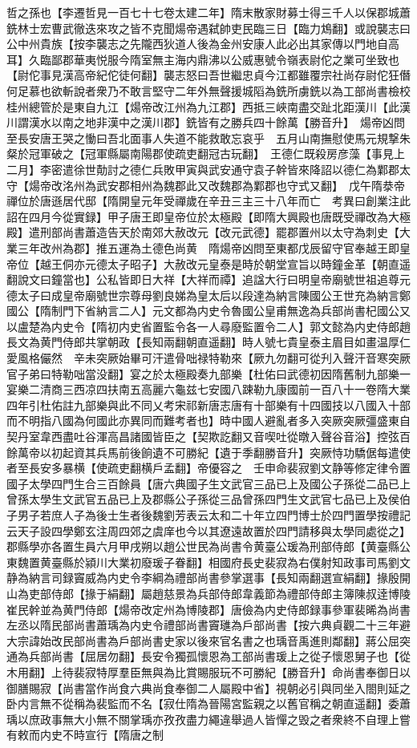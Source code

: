 哲之孫也【李遷哲見一百七十七卷太建二年】隋末散家財募士得三千人以保郡城蕭銑林士宏曹武徹迭來攻之皆不克聞煬帝遇弑帥吏民臨三日【臨力鴆翻】或說襲志曰公中州貴族【按李襲志之先隴西狄道人後為金州安康人此必出其家傳以門地自高耳】久臨鄙郡華夷悦服今隋室無主海内鼎沸以公威惠號令嶺表尉佗之業可坐致也【尉佗事見漢高帝紀佗徒何翻】襲志怒曰吾世繼忠貞今江都雖覆宗社尚存尉佗狂僭何足慕也欲斬說者衆乃不敢言堅守二年外無聲援城䧟為銑所虜銑以為工部尚書檢校桂州總管於是東自九江【煬帝改江州為九江郡】西抵三峽南盡交趾北距漢川【此漢川謂漢水以南之地非漢中之漢川郡】銑皆有之勝兵四十餘萬【勝音升】　煬帝凶問至長安唐王哭之慟曰吾北面事人失道不能救敢忘哀乎　五月山南撫慰使馬元規撃朱粲於冠軍破之【冠軍縣屬南陽郡使疏吏翻冠古玩翻】　王德仁既殺房彦藻【事見上二月】李密遣徐世勣討之德仁兵敗甲寅與武安通守袁子幹皆來降詔以德仁為鄴郡太守【煬帝改洺州為武安郡相州為魏郡此又改魏郡為鄴郡也守式又翻】　戊午隋㳟帝禪位於唐遜居代邸【隋開皇元年受禪歲在辛丑三主三十八年而亡　考異曰創業注此詔在四月今從實録】甲子唐王即皇帝位於太極殿【即隋大興殿也唐既受禪改為大極殿】遣刑部尚書蕭造告天於南郊大赦改元【改元武德】罷郡置州以太守為刺史【大業三年改州為郡】推五運為土德色尚黄　隋煬帝凶問至東都戊辰留守官奉越王即皇帝位【越王侗亦元德太子昭子】大赦改元皇泰是時於朝堂宣旨以時鐘金革【朝直遥翻說文曰鐘當也】公私皆即日大祥【大祥而禫】追諡大行曰明皇帝廟號世祖追尊元德太子曰成皇帝廟號世宗尊母劉良娣為皇太后以段達為納言陳國公王世充為納言鄭國公【隋制門下省納言二人】元文都為内史令魯國公皇甫無逸為兵部尚書杞國公又以盧楚為内史令【隋初内史省置監令各一人尋廢監置令二人】郭文懿為内史侍郎趙長文為黄門侍郎共掌朝政【長知兩翻朝直遥翻】時人號七貴皇泰主眉目如畫温厚仁愛風格儼然　辛未突厥始畢可汗遣骨咄禄特勒來【厥九勿翻可從刋入聲汗音寒突厥官子弟曰特勒咄當没翻】宴之於太極殿奏九部樂【杜佑曰武德初因隋舊制九部樂一宴樂二清商三西凉四扶南五高麗六龜兹七安國八踈勒九康國前一百八十一卷隋大業四年引杜佑註九部樂與此不同乂考宋祁新唐志唐有十部樂有十四國技以八國入十部而不明指八國為何國此亦異同而難考者也】時中國人避亂者多入突厥突厥彊盛東自契丹室韋西盡吐谷渾高昌諸國皆臣之【契欺訖翻又音喫吐從暾入聲谷音浴】控弦百餘萬帝以初起資其兵馬前後餉遺不可勝紀【遺于季翻勝音升】突厥恃功驕倨每遣使者至長安多暴横【使疏吏翻横戶孟翻】帝優容之　壬申命裴寂劉文静等修定律令置國子太學四門生合三百餘員【唐六典國子生文武官三品已上及國公子孫從二品已上曾孫太學生文武官五品已上及郡縣公子孫從三品曾孫四門生文武官七品已上及侯伯子男子若庶人子為後士生者後魏劉芳表云太和二十年立四門博士於四門置學按禮記云天子設四學鄭玄注周四郊之虞庠也今以其遼遠故置於四門請移與太學同處從之】郡縣學亦各置生員六月甲戌朔以趙公世民為尚書令黄臺公瑗為刑部侍郎【黄臺縣公東魏置黄臺縣於潁川大業初廢瑗子眷翻】相國府長史裴寂為右僕射知政事司馬劉文静為納言司録竇威為内史令李綱為禮部尚書參掌選事【長知兩翻選宣絹翻】掾殷開山為吏部侍郎【掾于絹翻】屬趙慈景為兵部侍郎韋義節為禮部侍郎主簿陳叔逹博陵崔民幹並為黄門侍郎【煬帝改定州為博陵郡】唐儉為内史侍郎録事參軍裴晞為尚書左丞以隋民部尚書蕭瑀為内史令禮部尚書竇璡為戶部尚書【按六典貞觀二十三年避大宗諱始改民部尚書為戶部尚書史家以後來官名書之也瑀音禹進則鄰翻】蔣公屈突通為兵部尚書【屈居勿翻】長安令獨孤懷恩為工部尚書瑗上之從子懷恩舅子也【從木用翻】上待裴寂特厚羣臣無與為比賞賜服玩不可勝紀【勝音升】命尚書奉御日以御膳賜寂【尚書當作尚食六典尚食奉御二人屬殿中省】視朝必引與同坐入閤則延之卧内言無不從稱為裴監而不名【寂仕隋為晉陽宮監親之以舊官稱之朝直遥翻】委蕭瑀以庶政事無大小無不關掌瑀亦孜孜盡力繩違舉過人皆憚之毁之者衆終不自理上嘗有敕而内史不時宣行【隋唐之制